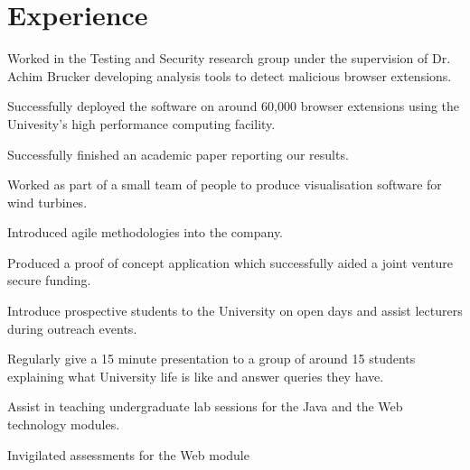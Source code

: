 \documentclass[]{deedy-resume-openfont}
\begin{document}
\begin{minipage}[t]{0.66\textwidth} 


\section{Experience}

\vspace{\topsep} %
\begin{tightemize}
\item Worked in the Testing and Security research group under the supervision of Dr. Achim Brucker developing analysis tools to detect malicious browser extensions.
\item Successfully deployed the software on around 60,000 browser extensions using the Univesity's high performance computing facility. 
\item Successfully finished an academic paper reporting our results.
\end{tightemize}
\sectionsep

\begin{tightemize}
\item Worked as part of a small team of people to produce visualisation software for wind turbines.
\item Introduced agile methodologies into the company.
\item Produced a proof of concept application which successfully aided a joint venture secure funding.
\end{tightemize}
\sectionsep


\begin{tightemize}
\item Introduce prospective students to the University on open days and assist lecturers during outreach events.
\item Regularly give a 15 minute presentation to a group of around 15 students explaining what University life is like and answer queries they have.
\end{tightemize}
\sectionsep

\begin{tightemize}
\item Assist in teaching undergraduate lab sessions for the Java and the Web technology modules.
\item Invigilated assessments for the Web module
\end{tightemize}
\sectionsep


\end{minipage}
\end{document}

